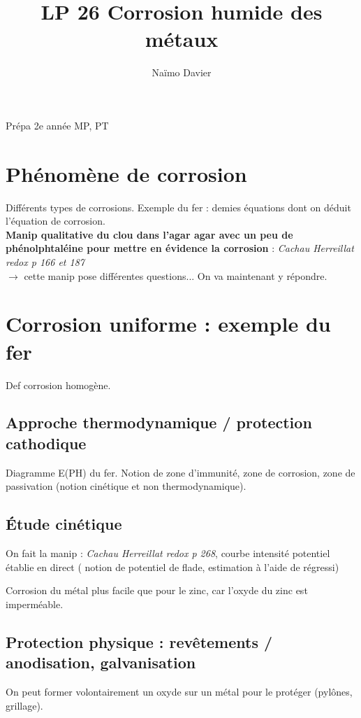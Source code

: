 \documentclass[12pt,prb,aps,epsf]{article}
\begin{document}
	
	\title{LP 26 Corrosion humide des métaux}
	\author{Naïmo Davier}
	
	\maketitle
	
	\tableofcontents
	
	\pagebreak
	
Prépa 2e année MP, PT
\section{Phénomène de corrosion}
Différents types de corrosions. Exemple du fer : demies équations dont on déduit l'équation de corrosion.\\

\textbf{Manip qualitative du clou dans l'agar agar avec un peu de phénolphtaléine pour mettre en évidence la corrosion} : \textit{ Cachau Herreillat redox p 166 et 187}\\

$\rightarrow$ cette manip pose différentes questions... On va maintenant y répondre.

\section{Corrosion uniforme : exemple du fer}
Def corrosion homogène.
\subsection{Approche thermodynamique / protection cathodique}
	Diagramme E(PH) du fer. Notion de zone d'immunité, zone de corrosion, zone de passivation (notion cinétique et non thermodynamique).
	
\subsection{Étude cinétique}
	On fait la manip : \textit{ Cachau Herreillat redox p 268}, courbe intensité potentiel établie en direct ( notion de potentiel de flade, estimation à l'aide de régressi)
	
	Corrosion du métal plus facile que pour le zinc, car l'oxyde du zinc est imperméable.
	
\subsection{Protection physique : revêtements / anodisation, galvanisation}
	On peut former volontairement un oxyde sur un métal pour le protéger (pylônes, grillage).
	
\end{document}
